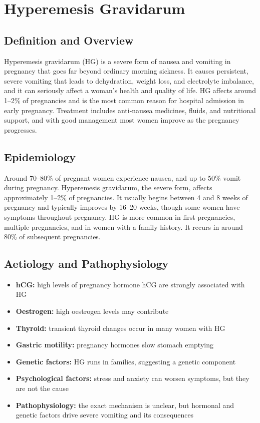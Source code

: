 \chapter{Hyperemesis Gravidarum}

\section*{Definition and Overview}
Hyperemesis gravidarum (HG) is a severe form of nausea and vomiting in pregnancy that goes far beyond ordinary morning sickness. It causes persistent, severe vomiting that leads to dehydration, weight loss, and electrolyte imbalance, and it can seriously affect a woman's health and quality of life. HG affects around 1--2\% of pregnancies and is the most common reason for hospital admission in early pregnancy. Treatment includes anti-nausea medicines, fluids, and nutritional support, and with good management most women improve as the pregnancy progresses.

\section*{Epidemiology}
Around 70--80\% of pregnant women experience nausea, and up to 50\% vomit during pregnancy. Hyperemesis gravidarum, the severe form, affects approximately 1--2\% of pregnancies. It usually begins between 4 and 8 weeks of pregnancy and typically improves by 16--20 weeks, though some women have symptoms throughout pregnancy. HG is more common in first pregnancies, multiple pregnancies, and in women with a family history. It recurs in around 80\% of subsequent pregnancies.

\section*{Aetiology and Pathophysiology}
\begin{itemize}
    \item \textbf{hCG:} high levels of pregnancy hormone hCG are strongly associated with HG
    \item \textbf{Oestrogen:} high oestrogen levels may contribute
    \item \textbf{Thyroid:} transient thyroid changes occur in many women with HG
    \item \textbf{Gastric motility:} pregnancy hormones slow stomach emptying
    \item \textbf{Genetic factors:} HG runs in families, suggesting a genetic component
    \item \textbf{Psychological factors:} stress and anxiety can worsen symptoms, but they are not the cause
    \item \textbf{Pathophysiology:} the exact mechanism is unclear, but hormonal and genetic factors drive severe vomiting and its consequences
\end{itemize}

